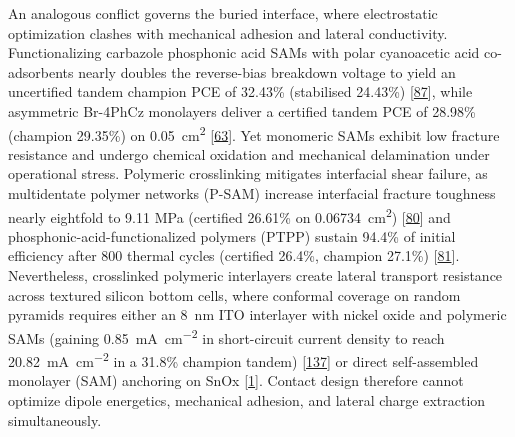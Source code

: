 \documentclass[
  11pt,
]{article}
\begin{document}
An analogous conflict governs the buried interface, where electrostatic
optimization clashes with mechanical adhesion and lateral conductivity.
Functionalizing carbazole phosphonic acid SAMs with polar cyanoacetic
acid co-adsorbents nearly doubles the reverse-bias breakdown voltage to
yield an uncertified tandem champion PCE of 32.43\% (stabilised 24.43\%)
{[}\href{https://doi.org/10.1002/adma.72738}{87}{]}, while asymmetric
Br-4PhCz monolayers deliver a certified tandem PCE of 28.98\% (champion
29.35\%) on \qty{0.05}{\centi\meter\squared}
{[}\href{https://doi.org/10.1002/adma.202523338}{63}{]}. Yet monomeric
SAMs exhibit low fracture resistance and undergo chemical oxidation and
mechanical delamination under operational stress. Polymeric crosslinking
mitigates interfacial shear failure, as multidentate polymer networks
(P-SAM) increase interfacial fracture toughness nearly eightfold to 9.11
MPa (certified 26.61\% on \qty{0.06734}{\centi\meter\squared})
{[}\href{https://doi.org/10.1002/aenm.71159}{80}{]} and
phosphonic-acid-functionalized polymers (PTPP) sustain 94.4\% of initial
efficiency after 800 thermal cycles (certified 26.4\%, champion 27.1\%)
{[}\href{https://doi.org/10.1002/adfm.75697}{81}{]}. Nevertheless,
crosslinked polymeric interlayers create lateral transport resistance
across textured silicon bottom cells, where conformal coverage on random
pyramids requires either an \qty{8}{\nano\meter} ITO interlayer with
nickel oxide and polymeric SAMs (gaining
\qty{0.85}{\milli\ampere\per\centi\meter\squared} in short-circuit
current density to reach
\qty{20.82}{\milli\ampere\per\centi\meter\squared} in a 31.8\% champion
tandem) {[}\href{https://doi.org/10.1002/adfm.75311}{137}{]} or direct
self-assembled monolayer (SAM) anchoring on SnOx
{[}\href{https://doi.org/10.1126/science.aef5355}{1}{]}. Contact design
therefore cannot optimize dipole energetics, mechanical adhesion, and
lateral charge extraction simultaneously.
\end{document}
